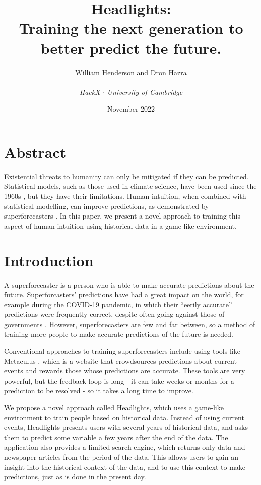 \documentclass{article}
\title{\textbf{Headlights}: \\
Training the next generation to \\
better predict the future.}
\author{William Henderson and Dron Hazra \\
\\
\textit{HackX $\cdot$ University of Cambridge}
}
\date{November 2022}
\begin{document}
\maketitle

\section{Abstract}

Existential threats to humanity can only be mitigated if they can be predicted. Statistical models, such as those used in climate science, have been used since the 1960s \cite{noaa}, but they have their limitations. Human intuition, when combined with statistical modelling, can improve predictions, as demonstrated by superforecasters \cite{superforecasters}. In this paper, we present a novel approach to training this aspect of human intuition using historical data in a game-like environment.

\section{Introduction}

A superforecaster is a person who is able to make accurate predictions about the future. Superforcasters' predictions have had a great impact on the world, for example during the COVID-19 pandemic, in which their ``eerily accurate'' predictions were frequently correct, despite often going against those of governments \cite{covid19}. However, superforecasters are few and far between, so a method of training more people to make accurate predictions of the future is needed.

Conventional approaches to training superforecasters include using tools like Metaculus \cite{metaculus}, which is a website that crowdsources predictions about current events and rewards those whose predictions are accurate. These tools are very powerful, but the feedback loop is long - it can take weeks or months for a prediction to be resolved - so it takes a long time to improve.

We propose a novel approach called Headlights, which uses a game-like environment to train people based on historical data. Instead of using current events, Headlights presents users with several years of historical data, and asks them to predict some variable a few years after the end of the data. The application also provides a limited search engine, which returns only data and newspaper articles from the period of the data. This allows users to gain an insight into the historical context of the data, and to use this context to make predictions, just as is done in the present day.
\end{document}

